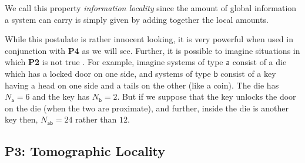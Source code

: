 \documentclass[10pt]{article}
\begin{document}
We call this property \emph{information locality} since the amount of global information a system can carry is simply given by adding together the local amounts.

While this postulate is rather innocent looking, it is very powerful when used in conjunction with {\bf P4} as we will see.  Further, it is possible to imagine situations in which {\bf P2} is not true \cite{hardy2010limited}.  For example, imagine systems of type $\mathsf a$ consist of a die which has a locked door on one side, and systems of type $\mathsf b$ consist of a key having a head on one side and a tails on the other (like a coin).  The die has $N_\mathsf{a}=6$ and the key has $N_\mathsf{b}=2$.  But if we suppose that the key unlocks the door on the die (when the two are proximate), and further, inside the die is another key then, $N_\mathsf{ab}=24$ rather than $12$.




\subsection{{\bf P3}: Tomographic Locality}\label{SecTomographiclocality}
\end{document}
